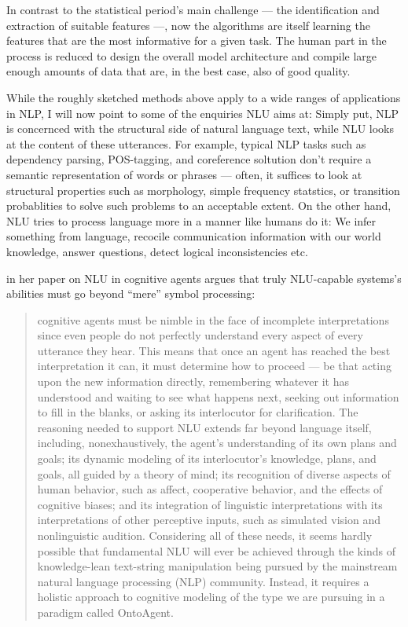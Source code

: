 In contrast to the statistical
period's main challenge --- the identification and extraction of suitable features ---, now the
algorithms are itself learning the features that are the most informative for a given task. The
human part in the process is reduced to design the overall model architecture and compile large
enough amounts of data that are, in the best case, also of good quality.

While the roughly sketched methods above apply to a wide ranges of
applications in NLP, I will now point to some of the enquiries NLU aims
at: Simply put, NLP is concernced with the structural side of natural
language text, while NLU looks at the content of these utterances. For
example, typical NLP tasks such as dependency parsing, POS-tagging, and
coreference soltution don't require a semantic representation of words
or phrases --- often, it suffices to look at structural properties such
as morphology, simple frequency statstics, or transition probablities
to solve such problems to an acceptable extent. On the other hand, NLU
tries to process language more in a manner like humans do it: We infer
something from language, recocile communication information with our
world knowledge, answer questions, detect logical inconsistencies etc.

{\color{red} \cite{mcshane2017natural} in her paper on NLU in cognitive agents argues that truly
NLU-capable systems's abilities must go beyond ``mere'' symbol processing:

\begin{quote}
  cognitive agents must be nimble in the face of incomplete interpretations since even people do not
  perfectly understand every aspect of every utterance they hear. This means that once an agent
  has reached the best interpretation it can, it must determine how to proceed — be that acting
  upon the new information directly, remembering whatever it has understood and waiting to see
  what happens next, seeking out information to fill in the blanks, or asking its interlocutor
  for clarification. The reasoning needed to support NLU extends far beyond language itself,
  including, nonexhaustively, the agent’s understanding of its own plans and goals; its dynamic
  modeling of its interlocutor’s knowledge, plans, and goals, all guided by a theory of mind;
  its recognition of diverse aspects of human behavior, such as affect, cooperative behavior,
  and the effects of cognitive biases; and its integration of linguistic interpretations with
  its interpretations of other perceptive inputs, such as simulated vision and nonlinguistic
  audition. Considering all of these needs, it seems hardly possible that fundamental NLU
  will ever be achieved through the kinds of knowledge-lean text-string manipulation being
  pursued by the mainstream natural language processing (NLP) community. Instead, it requires
  a holistic approach to cognitive modeling of the type we are pursuing in a paradigm called
  OntoAgent.
\end{quote}}

